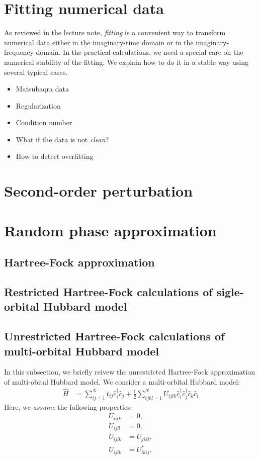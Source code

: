 \documentclass[submission, LectureNotes]{SciPost}
\begin{document}
\clearpage
\section{Fitting numerical data}
As reviewed in the lecture note, \textit{fitting} is a convenient way to transform numerical data either in the imaginary-time domain or in the imaginary-frequency domain.
In the practical calculations, we need a special care on the numerical stability of the fitting.
We explain how to do it in a stable way using several typical cases.

\begin{itemize}
    \item Matsubaqra data
    \item Regularization
    \item Condition number
    \item What if the data is not \textit{clean}?
    \item How to detect overfitting
\end{itemize}

\clearpage
\section{Second-order perturbation}

\clearpage
\section{Random phase approximation}
\subsection{Hartree-Fock approximation}
\clearpage
\subsection{Restricted Hartree-Fock calculations of sigle-orbital Hubbard model}

\clearpage
\subsection{Unrestricted Hartree-Fock calculations of multi-orbital Hubbard model}
In this subsection, we briefly reivew the unrestricted Hartree-Fock approximation of multi-obital Hubbard model.
We consider a multi-orbital Hubbard model:
\begin{align}
    \hat{H} &= \sum_{ij=1}^N t_{ij} \hat{c}^\dagger_i \hat{c}_j + \frac{1}{2} \sum_{ijkl=1}^N U_{ijlk}\hat{c}^\dagger_i \hat{c}^\dagger_j \hat{c}_k \hat{c}_l
\end{align}
Here, we \textit{assume} the following properties:
\begin{align}
U_{iilk} &= 0,\label{eq:U-prop-start}\\
U_{ijll} &= 0,\\
U_{ijlk} &= U_{jikl}, \\
U_{ijlk} &= U_{lkij}^*.\label{eq:U-prop-end}
\end{align}
\end{document}
